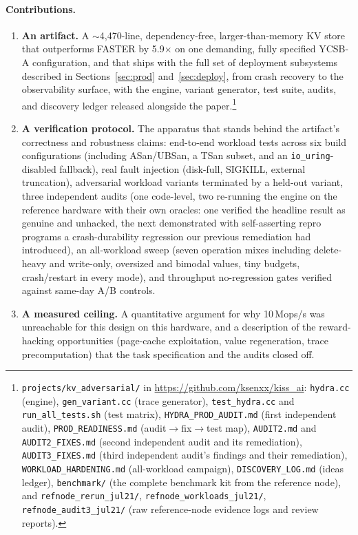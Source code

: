 \documentclass{article}
\newcommand{\SpeedupFinal}{5.9$\times$}
\newcommand{\EngineLocFinal}{$\sim$4{,}470}
\begin{document}
\paragraph{Contributions.}
\begin{enumerate}[nosep,leftmargin=1.4em]
\item \textbf{An artifact.} A \EngineLocFinal-line, dependency-free, larger-than-memory KV store that outperforms FASTER by \SpeedupFinal{} on one demanding, fully specified YCSB-A configuration, and that ships with the full set of deployment subsystems described in Sections~\ref{sec:prod} and~\ref{sec:deploy}, from crash recovery to the observability surface, with the engine, variant generator, test suite, audits, and discovery ledger released alongside the paper.\footnote{\texttt{projects/kv\_adversarial/} in \url{https://github.com/ksenxx/kiss_ai}: \texttt{hydra.cc} (engine), \texttt{gen\_variant.cc} (trace generator), \texttt{test\_hydra.cc} and \texttt{run\_all\_tests.sh} (test matrix), \texttt{HYDRA\_PROD\_AUDIT.md} (first independent audit), \texttt{PROD\_READINESS.md} (audit$\to$fix$\to$test map), \texttt{AUDIT2.md} and \texttt{AUDIT2\_FIXES.md} (second independent audit and its remediation), \texttt{AUDIT3\_FIXES.md} (third independent audit's findings and their remediation), \texttt{WORKLOAD\_HARDENING.md} (all-workload campaign), \texttt{DISCOVERY\_LOG.md} (ideas ledger), \texttt{benchmark/} (the complete benchmark kit from the reference node), and \texttt{refnode\_rerun\_jul21/}, \texttt{refnode\_workloads\_jul21/}, \texttt{refnode\_audit3\_jul21/} (raw reference-node evidence logs and review reports).}
\item \textbf{A verification protocol.} The apparatus that stands behind the artifact's correctness and robustness claims: end-to-end workload tests across six build configurations (including ASan/UBSan, a TSan subset, and an \texttt{io\_uring}-disabled fallback), real fault injection (disk-full, SIGKILL, external truncation), adversarial workload variants terminated by a held-out variant, three independent audits (one code-level, two re-running the engine on the reference hardware with their own oracles: one verified the headline result as genuine and unhacked, the next demonstrated with self-asserting repro programs a crash-durability regression our previous remediation had introduced), an all-workload sweep (seven operation mixes including delete-heavy and write-only, oversized and bimodal values, tiny budgets, crash/restart in every mode), and throughput no-regression gates verified against same-day A/B controls.
\item \textbf{A measured ceiling.} A quantitative argument for why 10\,Mops/s was unreachable for this design on this hardware, and a description of the reward-hacking opportunities (page-cache exploitation, value regeneration, trace precomputation) that the task specification and the audits closed off.
\end{enumerate}
\end{document}
